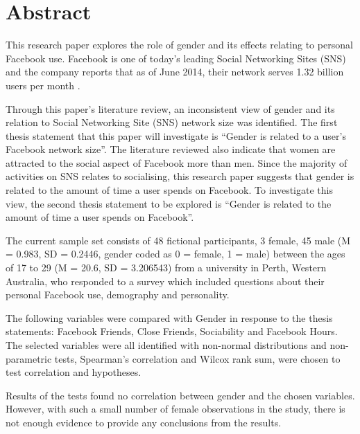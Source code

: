 \section{Abstract}

This research paper explores the role of gender and its effects relating to personal Facebook use. Facebook is one of today's leading Social Networking Sites (SNS) and the company reports that as of June 2014, their network serves 1.32 billion users per month \citep{Facebook2014}.

Through this paper's literature review, an inconsistent view of gender and its relation to Social Networking Site (SNS) network size was identified. The first thesis statement that this paper will investigate is ``Gender is related to a user's Facebook network size''. The literature reviewed also indicate that women are attracted to the social aspect of Facebook more than men. Since the majority of activities on SNS relates to socialising, this research paper suggests that gender is related to the amount of time a user spends on Facebook. To investigate this view, the second thesis statement to be explored is ``Gender is related to the amount of time a user spends on Facebook''.

The current sample set consists of 48 fictional participants, 3 female, 45 male (M = 0.983, SD = 0.2446, gender coded as 0 = female, 1 = male) between the ages of 17 to 29 (M = 20.6, SD = 3.206543) from a university in Perth, Western Australia, who responded to a survey which included questions about their personal Facebook use, demography and personality.

The following variables were compared with Gender in response to the thesis statements: Facebook Friends, Close Friends, Sociability and Facebook Hours. The selected variables were all identified with non-normal distributions and non-parametric tests, Spearman's correlation and Wilcox rank sum, were chosen to test correlation and hypotheses.

Results of the tests found no correlation between gender and the chosen variables. However, with such a small number of female observations in the study, there is not enough evidence to provide any conclusions from the results.